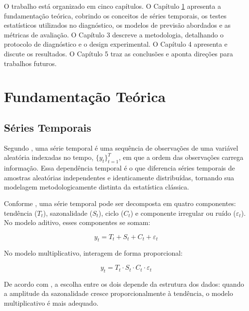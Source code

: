 \documentclass[
  12pt,
  openright,
  twoside,
  a4paper,
  english,
  brazil
]{abntex2}
\begin{document}
O trabalho está organizado em cinco capítulos. O Capítulo \ref{cap:fundamentacao} apresenta a fundamentação teórica, cobrindo os conceitos de séries temporais, os testes estatísticos utilizados no diagnóstico, os modelos de previsão abordados e as métricas de avaliação. O Capítulo 3 descreve a metodologia, detalhando o protocolo de diagnóstico e o design experimental. O Capítulo 4 apresenta e discute os resultados. O Capítulo 5 traz as conclusões e aponta direções para trabalhos futuros.

\chapter{Fundamentação Teórica}
\label{cap:fundamentacao}

\section{Séries Temporais}
\label{sec:series-temporais}

Segundo , uma série temporal é uma sequência de observações de uma variável aleatória indexadas no tempo, $\{y_t\}_{t=1}^{T}$, em que a ordem das observações carrega informação. Essa dependência temporal é o que diferencia séries temporais de amostras aleatórias independentes e identicamente distribuídas, tornando sua modelagem metodologicamente distinta da estatística clássica.

Conforme , uma série temporal pode ser decomposta em quatro componentes: tendência ($T_t$), sazonalidade ($S_t$), ciclo ($C_t$) e componente irregular ou ruído ($\varepsilon_t$). No modelo aditivo, esses componentes se somam:

\begin{equation}
  y_t = T_t + S_t + C_t + \varepsilon_t
  \label{eq:decomposicao-aditiva}
\end{equation}

No modelo multiplicativo, interagem de forma proporcional:

\begin{equation}
  y_t = T_t \cdot S_t \cdot C_t \cdot \varepsilon_t
  \label{eq:decomposicao-multiplicativa}
\end{equation}

De acordo com , a escolha entre os dois depende da estrutura dos dados: quando a amplitude da sazonalidade cresce proporcionalmente à tendência, o modelo multiplicativo é mais adequado.
\end{document}
